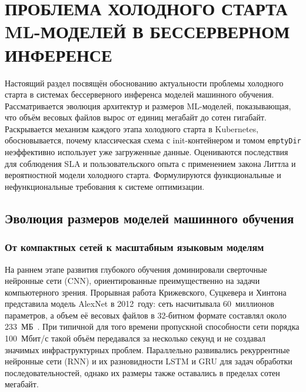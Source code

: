 \chapter{ПРОБЛЕМА ХОЛОДНОГО СТАРТА ML-МОДЕЛЕЙ В БЕССЕРВЕРНОМ ИНФЕРЕНСЕ}

Настоящий раздел посвящён обоснованию актуальности проблемы холодного старта в системах бессерверного инференса моделей машинного обучения. Рассматривается эволюция архитектур и размеров ML-моделей, показывающая, что объём весовых файлов вырос от единиц мегабайт до сотен гигабайт. Раскрывается механизм каждого этапа холодного старта в Kubernetes, обосновывается, почему классическая схема с init-контейнером и томом \texttt{emptyDir} неэффективно использует уже загруженные данные. Оцениваются последствия для соблюдения SLA и пользовательского опыта с применением закона Литтла и вероятностной модели холодного старта. Формулируются функциональные и нефункциональные требования к системе оптимизации.

\section{Эволюция размеров моделей машинного обучения}

\subsection{От компактных сетей к масштабным языковым моделям}

На раннем этапе развития глубокого обучения доминировали сверточные нейронные сети (CNN), ориентированные преимущественно на задачи компьютерного зрения. Прорывная работа Крижевского, Суцкевера и Хинтона представила модель AlexNet в 2012~году: сеть насчитывала 60~миллионов параметров, а объем её весовых файлов в 32-битном формате составлял около 233~МБ~\cite{alexnet2012}. При типичной для того времени пропускной способности сети порядка 100~Мбит/с такой объём передавался за несколько секунд и не создавал значимых инфраструктурных проблем. Параллельно развивались рекуррентные нейронные сети (RNN) и их разновидности LSTM и GRU для задач обработки последовательностей, однако их размеры также оставались в пределах сотен мегабайт.

